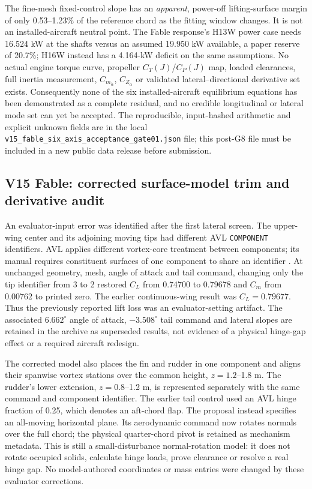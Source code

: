 \documentclass[11pt,a4paper]{article}
\begin{document}
The fine-mesh fixed-control slope has an \emph{apparent}, power-off
lifting-surface margin of only 0.53--1.23\% of the reference chord as the
fitting window changes. It is not an installed-aircraft neutral point.
The Fable response's H13W power case needs 16.524 kW at the shafts versus
an assumed 19.950 kW available, a paper reserve of 20.7\%; H16W instead
has a 4.164-kW deficit on the same assumptions. No actual engine torque
curve, propeller $C_T(J)$/$C_P(J)$ map, loaded clearances, full inertia
measurement, $C_{m_{\dot\alpha}}$, $C_{Z_{\dot\alpha}}$ or validated
lateral--directional derivative set exists. Consequently none of the six
installed-aircraft equilibrium equations has been demonstrated as a
complete residual, and no credible longitudinal or lateral mode set can
yet be accepted. The reproducible, input-hashed arithmetic and explicit
unknown fields are in the local
\texttt{v15\_fable\_six\_axis\_acceptance\_gate01.json} file; this
post-G8 file must be included in a new public data release before submission.

\subsection{V15 Fable: corrected surface-model trim and derivative audit}
\label{sec:v15-fable-lateral}

An evaluator-input error was identified after the first lateral screen.
The upper-wing center and its adjoining moving tips had different AVL
\texttt{COMPONENT} identifiers. AVL applies different vortex-core treatment
between components; its manual requires constituent surfaces of one component
to share an identifier \cite{ref22}. At unchanged geometry, mesh, angle of
attack and tail command, changing only the tip identifier from 3 to 2 restored
$C_L$ from 0.74700 to 0.79678 and $C_m$ from 0.00762 to printed zero.
The earlier continuous-wing result was $C_L=0.79677$. Thus the previously
reported lift loss was an evaluator-setting artifact. The associated
$6.662^\circ$ angle of attack, $-3.508^\circ$ tail command and lateral slopes
are retained in the archive as superseded results, not evidence of a physical
hinge-gap effect or a required aircraft redesign.

The corrected model also places the fin and rudder in one component and
aligns their spanwise vortex stations over the common height, $z=1.2$--1.8 m.
The rudder's lower extension, $z=0.8$--1.2 m, is represented separately with
the same command and component identifier. The earlier tail control used
an AVL hinge fraction of 0.25, which denotes an aft-chord flap. The proposal
instead specifies an all-moving horizontal plane. Its aerodynamic command
now rotates normals over the full chord; the physical quarter-chord pivot
is retained as mechanism metadata. This is still a small-disturbance
normal-rotation model: it does not rotate occupied solids, calculate hinge
loads, prove clearance or resolve a real hinge gap. No model-authored
coordinates or mass entries were changed by these evaluator corrections.
\end{document}
